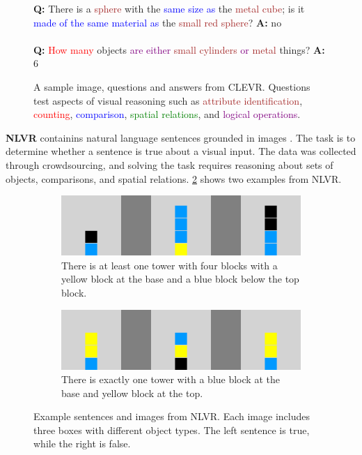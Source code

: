 \begin{figure}[ht]
\begin{minipage}{0.49\textwidth}
    \textbf{Q:} There is a \textcolor{brown}{sphere} with the \textcolor{blue}{same size as}
    the \textcolor{brown}{metal cube}; is it
    \textcolor{blue}{made of the same material as} the \textcolor{brown}{small red sphere}? \textbf{A:} no \\\\
    \textbf{Q:} \textcolor{red}{How many} objects \textcolor{purple}{are either}
    \textcolor{brown}{small cylinders}
    \textcolor{purple}{or} \textcolor{brown}{metal} things? \textbf{A:} 6
  \end{minipage}
  \vspace{1mm}
  \caption{A sample image, questions and answers from CLEVR. Questions test aspects of visual reasoning
    such as \textcolor{brown}{attribute identification}, \textcolor{red}{counting},
    \textcolor{blue}{comparison}, \textcolor{green}{spatial relations},
    and \textcolor{purple}{logical operations}.
  }
  \vspace{-4mm}
  \label{fig:clevr_example}
\end{figure}

\textbf{NLVR} containins natural language sentences grounded in images \cite{suhr-etal-2017-corpus}. The task is to determine whether a sentence is true about a visual input. The data was collected through crowdsourcing, and solving the task requires reasoning about sets of objects, comparisons, and spatial relations. \cref{fig:nlvr_examples} shows two examples from NLVR.

\begin{figure}[ht]
  \centering
    \centering
    \begin{subfigure}[b]{0.49\linewidth}
    \centering
    \includegraphics[width=\linewidth]{images/datasets/nlvr_ex_0.png}
    \caption{There is at least one tower with four blocks with a yellow block at the base and a blue block below the top block.}
     \end{subfigure}
     \hfill
     \begin{subfigure}[b]{0.49\linewidth}
     \centering
    \includegraphics[width=\linewidth]{images/datasets/nlvr_ex_1.png}
    \caption{There is exactly one tower with a blue block at the base and yellow block at the top.}
     \end{subfigure}
    \caption{Example sentences and images from NLVR. Each image includes three boxes with different object types. The left sentence is true, while the right is false.}
    \label{fig:nlvr_examples}
\end{figure}

